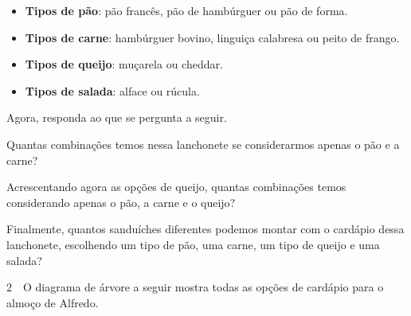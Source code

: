 \begin{mdframed}[linewidth=2pt,linecolor=salmao,roundcorner=2pt]
\begin{escolha}
{\begin{escolha}
\begin{itemize}
  \item \textbf{Tipos de pão}: pão francês, pão de hambúrguer ou pão de forma.
  \item \textbf{Tipos de carne}: hambúrguer bovino, linguiça calabresa ou peito de frango.
  \item \textbf{Tipos de queijo}: muçarela ou cheddar.
  \item \textbf{Tipos de salada}: alface ou rúcula.
\end{itemize}

Agora, responda ao que se pergunta a seguir.

\begin{escolha}
\item
  Quantas combinações temos nessa lanchonete se considerarmos apenas o
  pão e a carne?

\begin{mdframed}[linewidth=2pt,linecolor=salmao,roundcorner=2pt]
\vspace{3cm}
\end{mdframed}

\item
  Acrescentando agora as opções de queijo, quantas combinações temos
  considerando apenas o pão, a carne e o queijo?

\begin{mdframed}[linewidth=2pt,linecolor=salmao,roundcorner=2pt]
\vspace{5cm}
\end{mdframed}

\item
  Finalmente, quantos sanduíches diferentes podemos montar com o
  cardápio dessa lanchonete, escolhendo um tipo de pão, uma carne, um tipo de queijo e uma
  salada?

\begin{mdframed}[linewidth=2pt,linecolor=salmao,roundcorner=2pt]
\vspace{7cm}
\end{mdframed}

\end{escolha}

\num{2}　O diagrama de árvore a seguir mostra todas as opções de cardápio para o
almoço de Alfredo.



\end{escolha}}
\end{escolha}
\end{mdframed}
